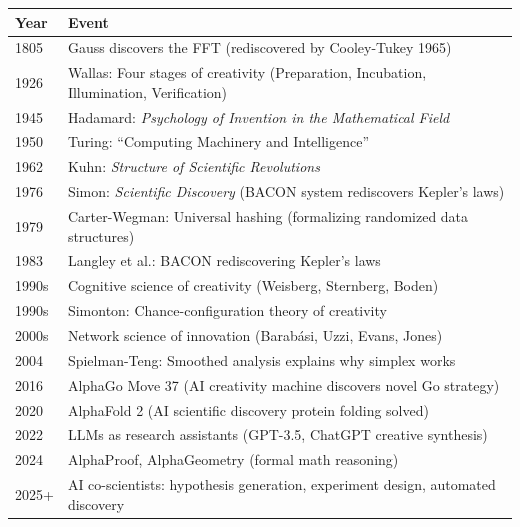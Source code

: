 \begin{tabularx}{\linewidth}{|l|X|}
\hline
\textbf{Year} & \textbf{Event} \\ \hline
1805 & Gauss discovers the FFT (rediscovered by Cooley-Tukey 1965) \\
\hline
1926 & Wallas: Four stages of creativity (Preparation, Incubation, Illumination, Verification) \\
\hline
1945 & Hadamard: \emph{Psychology of Invention in the Mathematical Field} \\
\hline
1950 & Turing: ``Computing Machinery and Intelligence'' \\
\hline
1962 & Kuhn: \emph{Structure of Scientific Revolutions} \\
\hline
1976 & Simon: \emph{Scientific Discovery} (BACON system rediscovers Kepler's laws) \\
\hline
1979 & Carter-Wegman: Universal hashing (formalizing randomized data structures) \\
\hline
1983 & Langley et al.: BACON rediscovering Kepler's laws \\
\hline
1990s & Cognitive science of creativity (Weisberg, Sternberg, Boden) \\
\hline
1990s & Simonton: Chance-configuration theory of creativity \\
\hline
2000s & Network science of innovation (Barab\'asi, Uzzi, Evans, Jones) \\
\hline
2004 & Spielman-Teng: Smoothed analysis explains why simplex works \\
\hline
2016 & AlphaGo Move 37 (AI creativity machine discovers novel Go strategy) \\
\hline
2020 & AlphaFold 2 (AI scientific discovery protein folding solved) \\
\hline
2022 & LLMs as research assistants (GPT-3.5, ChatGPT creative synthesis) \\
\hline
2024 & AlphaProof, AlphaGeometry (formal math reasoning) \\
\hline
2025+ & AI co-scientists: hypothesis generation, experiment design, automated discovery \\
\hline
\end{tabularx}


